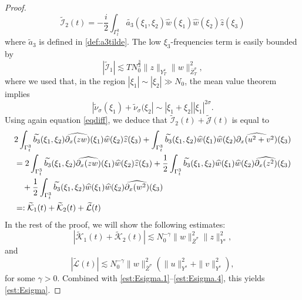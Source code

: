 \documentclass{amsart}
\theoremstyle{definition}
\theoremstyle{remark}
\numberwithin{equation}{section}
\begin{document}
\begin{proof}
$$
\widetilde{\mathcal{I}}_2(t) = -\frac i2 \int_{\Gamma^3_t} \widetilde{a_3}(\xi_1,\xi_2)  \widehat{w}(\xi_1) \widehat{w}(\xi_2)\widehat{z}(\xi_3)
$$
where $\widetilde{a}_3$ is defined in \eqref{def:a3tilde}. The low $\xi_3$-frequencies term is easily bounded by
\begin{equation}\label{est:Esigma.3}
|\widetilde{\mathcal{I}}_1| \lesssim TN_0^{\frac 32} \|z\|_{Y^s_T} \|w\|_{\overline{Z}^\sigma_T}^2,
\end{equation}
where  we used that, in the region $|\xi_1|\sim |\xi_2|\gg N_0$, the mean value theorem implies
$$
|\widetilde{\nu}_\sigma(\xi_1)+\widetilde{\nu}_\sigma(\xi_2|\sim |\xi_1+\xi_2| |\xi_1|^{2\sigma}.
$$
Using again equation \eqref{eqdiff}, we deduce that $\widetilde{\mathcal{I}}_2(t) + \widetilde{\mathcal{J}}(t)$ is equal to
\begin{align}
  &2\int_{\Gamma^3_t} \widetilde{b_3}(\xi_1, \xi_2) \widehat{\partial_x(zw)}(\xi_1) \widehat{w}(\xi_2) \widehat{z}(\xi_3) + \int_{\Gamma^3_t} \widetilde{b_3}(\xi_1, \xi_2) \widehat{w}(\xi_1) \widehat{w}(\xi_2) \widehat{\partial_x(u^2+v^2)}(\xi_3) \notag \\
  &=2\int_{\Gamma^3_t} \widetilde{b_3}(\xi_1, \xi_2) \widehat{\partial_x(zw)}(\xi_1) \widehat{w}(\xi_2) \widehat{z}(\xi_3) + \frac 12\int_{\Gamma^3_t} \widetilde{b_3}(\xi_1, \xi_2) \widehat{w}(\xi_1) \widehat{w}(\xi_2) \widehat{\partial_x(z^2)}(\xi_3)\notag \\
  &\quad + \frac 12\int_{\Gamma^3_t} \widetilde{b_3}(\xi_1, \xi_2) \widehat{w}(\xi_1) \widehat{w}(\xi_2) \widehat{\partial_x(w^2)}(\xi_3) \notag \\
  &=: \widetilde{\mathcal{K}}_1(t) + \widetilde{\mathcal{K}}_2(t) + \widetilde{\mathcal{L}}(t) \label{est:Esigma.4}
\end{align}
In the rest of the proof, we will show the following estimates:
\begin{equation}\label{est:Esigma.5}
 |\widetilde{\mathcal{K}}_1(t) + \widetilde{\mathcal{K}}_2(t)| \lesssim N_0^{-\gamma} \|w\|_{\overline{Z}^\sigma}^2 \|z\|_{Y^s}^2,
\end{equation}
and
\begin{equation}\label{est:Esigma.6}
 |\widetilde{\mathcal{L}}(t)| \lesssim N_0^{-\gamma} \|w\|_{\overline{Z}^\sigma}^2 (\|u\|_{Y^s}^2 + \|v\|_{Y^s}^2),
\end{equation}
for some $\gamma>0$. Combined with \eqref{est:Esigma.1}--\eqref{est:Esigma.4}, this yields \eqref{est:Esigma}.


\end{proof}
\end{document}
